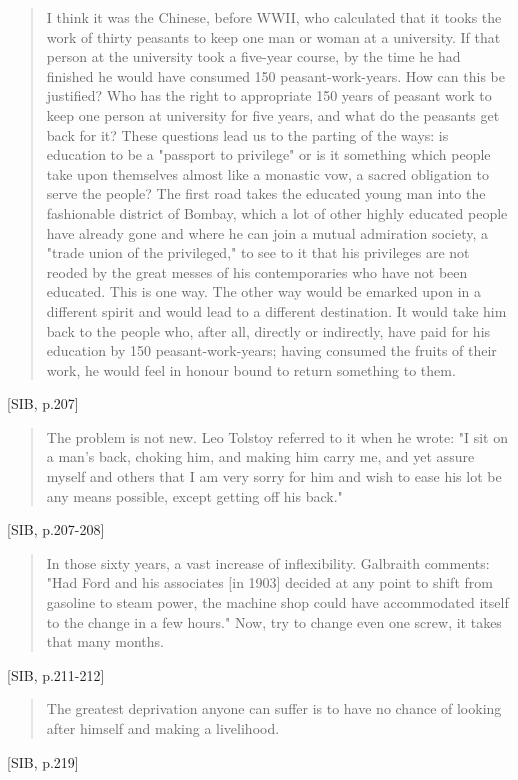 \begin{quote}
  I think it was the Chinese, before WWII, who calculated that it tooks the work of thirty peasants to keep one man or woman at a university. If that person at the university took a five-year course, by the time he had finished he would have consumed 150 peasant-work-years. How can this be justified? Who has the right to appropriate 150 years of peasant work to keep one person at university for five years, and what do the peasants get back for it? These questions lead us to the parting of the ways: is education to be a "passport to privilege" or is it something which people take upon themselves almost like a monastic vow, a sacred obligation to serve the people? The first road takes the educated young man into the fashionable district of Bombay, which a lot of other highly educated people have already gone and where he can join a mutual admiration society, a "trade union of the privileged," to see to it that his privileges are not reoded by the great messes of his contemporaries who have not been educated. This is one way. The other way would be emarked upon in a different spirit and would lead to a different destination. It would take him back to the people who, after all, directly or indirectly, have paid for his education by 150 peasant-work-years; having consumed the fruits of their work, he would feel in honour bound to return something to them.
\end{quote}[SIB, p.207]

\begin{quote}
  The problem is not new. Leo Tolstoy referred to it when he wrote: "I sit on a man's back, choking him, and making him carry me, and yet assure myself and others that I am very sorry for him and wish to ease his lot be any means possible, except getting off his back."
\end{quote}[SIB, p.207-208]

\begin{quote}
  In those sixty years, a vast increase of inflexibility. Galbraith comments: "Had Ford and his associates [in 1903] decided at any point to shift from gasoline to steam power, the machine shop could have accommodated itself to the change in a few hours." Now, try to change even one screw, it takes that many months.
\end{quote}[SIB, p.211-212]

\begin{quote}
  The greatest deprivation anyone can suffer is to have no chance of looking after himself and making a livelihood.
\end{quote}[SIB, p.219]

